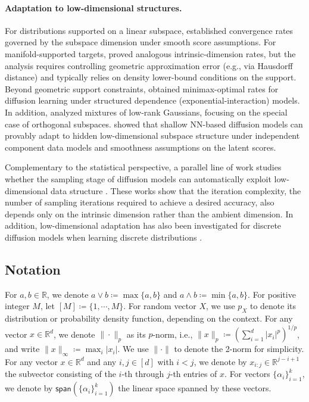 \documentclass{article}
\newcommand{\defn}{\coloneqq}
\newcommand{\bR}{\mathbb{R}}
\theoremstyle{plain}
\theoremstyle{remark}
\begin{document}
\paragraph*{Adaptation to low-dimensional structures.}
For distributions supported on a linear subspace, \citet{chen2023scoreapproximationestimationdistribution} established convergence rates governed by the subspace dimension under smooth score assumptions. 
For manifold-supported targets, \citet{azangulov2025convergencediffusionmodelsmanifold} proved analogous intrinsic-dimension rates, but the analysis requires controlling geometric approximation error (e.g., via Hausdorff distance) and typically relies on density lower-bound conditions on the support.
Beyond geometric support constraints, \citet{fan2025optimalestimationfactorizabledensity} obtained minimax-optimal rates for diffusion learning under structured dependence (exponential-interaction) models.
In addition, \citet{wang2025diffusionmodelslearnlowdimensional} analyzed mixtures of low-rank Gaussians, focusing on the special case of orthogonal subspaces. \citet{boffi2025shallow} showed that shallow NN-based diffusion models can provably adapt to hidden low-dimensional subspace structure under independent component data models and smoothness assumptions on the latent scores.

Complementary to the statistical perspective, a parallel line of work studies whether the sampling stage of diffusion models can automatically exploit low-dimensional data structure \citep{li2024adaptingunknownlowdimensionalstructures,liang2025lowdimensionaladaptationdiffusionmodels,potaptchik2024linear,huang2024denoising}. These works show that the iteration complexity, the number of sampling iterations required to achieve a desired accuracy, also depends only on the intrinsic dimension rather than the ambient dimension. In addition, low-dimensional adaptation has also been investigated for discrete diffusion models when learning discrete distributions \citep{li2025breaking,zhao2026adaptation,cai2026confidence,chen2025optimal,dmitriev2026efficient}.



\subsection{Notation}
For $a,b\in\bR$, we denote $a \vee b \defn \max\{a,b\}$ and $a\wedge b \defn \min\{a,b\}$.
For positive integer $M$, let $[M]\defn\{1,\cdots,M\}$. 
For random vector $X$, we use $p_X$ to denote its distribution or probability density function, depending on the context.
For any vector $x\in \mathbb{R}^d$, we denote $\| \cdot \|_p$ as its $p$-norm, i.e., $\|x\|_p \defn (\sum_{i=1}^d |x_i|^p)^{1/p}$, and write $\|x\|_{\infty} \defn \max_{i}|x_i|$. We use $\|\cdot\|$ to denote the 2-norm for simplicity. 
For any vector $x\in \mathbb{R}^d$ and any $i,j\in[d]$ with $i<j$, we denote by $x_{i:j} \in \mathbb{R}^{j-i+1}$ the subvector consisting of the $i$-th through $j$-th entries of $x$.
For vectors $\{\alpha_i\}_{i=1}^k$, we denote by $\mathsf{span}(\{ \alpha_i \}_{i=1}^k) $ the linear space spanned by these vectors.
\end{document}

